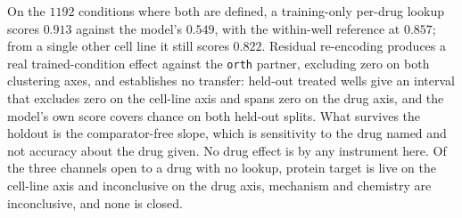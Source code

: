 \begin{claim}
On the $\num{1192}$ conditions where both are defined, a training-only per-drug
lookup scores $0.913$ against the model's $0.549$, with the within-well reference
at $0.857$; from a single other cell line it still scores $0.822$. Residual
re-encoding produces a real trained-condition effect against the \texttt{orth}
partner, excluding zero on both clustering axes, and establishes no transfer:
held-out treated wells give an interval that excludes zero on the cell-line axis
and spans zero on the drug axis, and the model's own score covers chance on both
held-out splits. What survives the holdout is the comparator-free slope, which is
sensitivity to the drug named and not accuracy about the drug given. No drug
effect is \shownzero by any instrument here. Of the three channels open to a drug
with no lookup, protein target is live on the cell-line axis and inconclusive on
the drug axis, mechanism and chemistry are inconclusive, and none is closed.
\end{claim}
